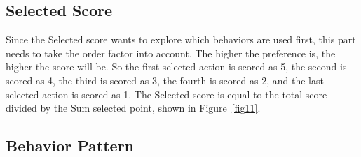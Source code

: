 \subsection{Selected Score}

Since the Selected score wants to explore which behaviors are used first, this part needs to take the order factor into account. The higher the preference is, the higher the score will be. So the first selected action is scored as 5, the second is scored as 4, the third is scored as 3, the fourth is scored as 2, and the last selected action is scored as 1. The Selected score is equal to the total score divided by the Sum selected point, shown in Figure~\ref{fig11}.

\subsection{Behavior Pattern}

